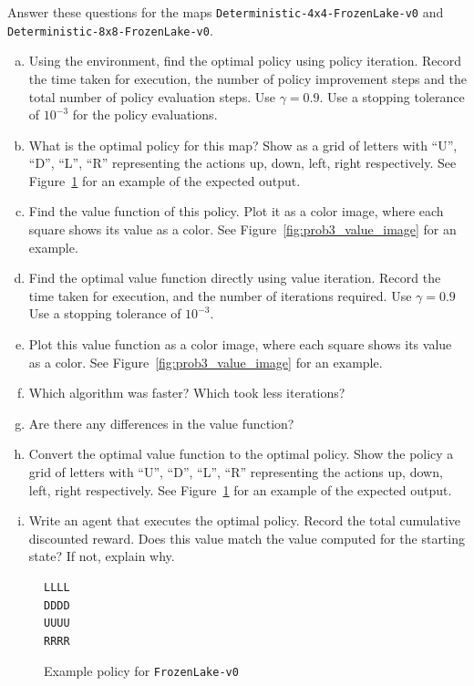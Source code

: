 \documentclass[12pt]{article}
\begin{document}
Answer these questions for the maps
\texttt{Deterministic-4x4-FrozenLake-v0} and \\
\texttt{Deterministic-8x8-FrozenLake-v0}.

\begin{enumerate}[a)]
\item Using the environment, find the optimal policy using policy
  iteration. Record the time taken for execution, the number of policy
  improvement steps and the total number of policy evaluation
  steps. Use $\gamma=0.9$. Use a stopping tolerance of
  $10^{-3}$ for the policy evaluations.
\item What is the optimal policy for this map? Show as a grid of
  letters with ``U'', ``D'', ``L'', ``R'' representing the actions up,
  down, left, right respectively. See
  Figure~\ref{fig:prob2_example_policy} for an example of the expected
  output.  
\item Find the value function of this policy. Plot it as a color
  image, where each square shows its value as a color. See
  Figure~\ref{fig:prob3_value_image} for an example.
\item Find the optimal value function directly using value
  iteration. Record the time taken for execution, and the number of
  iterations required. Use $\gamma=0.9$ Use a stopping tolerance of
  $10^{-3}$.
\item Plot this value function as a color image, where each square
  shows its value as a color. See Figure~\ref{fig:prob3_value_image}
  for an example.
\item Which algorithm was faster? Which took less iterations?
\item Are there any differences in the value function?
\item Convert the optimal value function to the optimal policy. Show
  the policy a grid of letters with ``U'', ``D'', ``L'', ``R''
  representing the actions up, down, left, right respectively. See
  Figure~\ref{fig:prob2_example_policy} for an example of the expected
  output.
\item Write an agent that executes the optimal policy. Record the
  total cumulative discounted reward. Does this value match the value
  computed for the starting state? If not, explain why.
\end{enumerate}

\begin{figure}[ht]
  \centering
  \begin{BVerbatim}
LLLL
DDDD
UUUU
RRRR
  \end{BVerbatim}
  \caption{\label{fig:prob2_example_policy} Example policy for \texttt{FrozenLake-v0}}
\end{figure}
\end{document}
